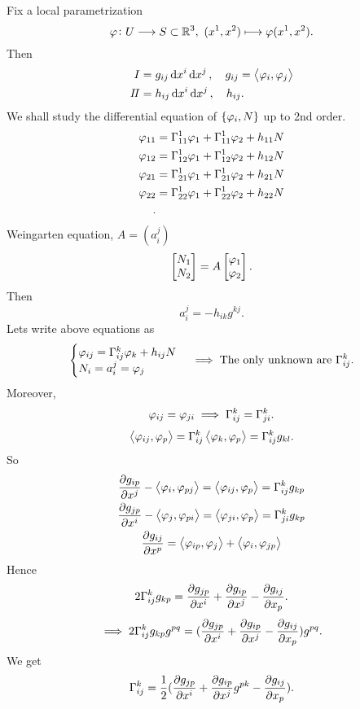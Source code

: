 Fix a local parametrization \[
    \varphi\colon U \longrightarrow S\subset \mathbb{R}^3,
    \ (x^1,x^2)\longmapsto \varphi(x^1,x^2)
.\] Then
\begin{align*}
    I&=g_{ij}\dd{x^i}\dd{x^j},\quad g_{ij}=\left<\varphi_i,\varphi_j\right> \\
    I\!I&=h_{ij}\dd{x^i}\dd{x^j},\quad h_{ij}
.\end{align*}
We shall study the differential equation of \(\{\varphi_i,N\}\) up to 2nd order.
\begin{align*}
    \varphi_{11}&=\Gamma_{11}^1\varphi_1+\Gamma_{11}^1\varphi_2+h_{11}N\\
    \varphi_{12}&=\Gamma_{12}^1\varphi_1+\Gamma_{12}^1\varphi_2+h_{12}N\\
    \varphi_{21}&=\Gamma_{21}^1\varphi_1+\Gamma_{21}^1\varphi_2+h_{21}N\\
    \varphi_{22}&=\Gamma_{22}^1\varphi_1+\Gamma_{22}^1\varphi_2+h_{22}N\\
.\end{align*}
Weingarten equation, \(A=(a_i^j)\)
\[
    \begin{bmatrix}
        N_1 \\ N_2
    \end{bmatrix}=A\begin{bmatrix}
        \varphi_1 \\ \varphi_2
    \end{bmatrix}
.\] Then \[
    a_i^j=-h_{ik}g^{kj}
.\] Lets write above equations as
\begin{equation}\label{eq:motion}
    \begin{cases}
        \varphi_{ij}=\Gamma_{ij}^k\varphi_k+h_{ij}N \\
        N_i=a_i^j=\varphi_j
    \end{cases}
    \implies \text{The only unknown are }\Gamma_{ij}^k
.\end{equation}
Moreover, \[
    \varphi_{ij}=\varphi_{ji}\implies \Gamma_{ij}^k=\Gamma_{ji}^k
.\] \[
    \left<\varphi_{ij},\varphi_p\right> =\Gamma_{ij}^k \left<\varphi_k,\varphi_p\right> 
    =\Gamma_{ij}^kg_{kl}
.\] So
\begin{gather*}
    \pdv{g_{ip}}{x^j}-\left<\varphi_i,\varphi_{pj}\right> 
    =\left<\varphi_{ij},\varphi_p\right> =\Gamma_{ij}^kg_{kp} \\
    \pdv{g_{jp}}{x^i}-\left<\varphi_j,\varphi_{pi}\right> 
    =\left<\varphi_{ji},\varphi_p\right> =\Gamma_{ji}^kg_{kp} \\
    \pdv{g_{ij}}{x^p}=\left<\varphi_{ip},\varphi_j\right>
    +\left<\varphi_i,\varphi_{jp}\right> 
\end{gather*}
Hence \[
    2\Gamma_{ij}^k g_{kp}=\pdv{g_{jp}}{x^i}+\pdv{g_{ip}}{x^j}-\pdv{g_{ij}}{x_{p}}
.\] \[
    \implies 2\Gamma_{ij}^kg_{kp}g^{pq}
    =(\pdv{g_{jp}}{x^i}+\pdv{g_{ip}}{x^j}-\pdv{g_{ij}}{x_{p}})g^{pq}
.\] We get \[
    \Gamma_{ij}^k=\frac{1}{2}(\pdv{g_{jp}}{x^i}+\pdv{g_{ip}}{x^j}g^{pk}
    -\pdv{g_{ij}}{x_{p}})
.\] 

